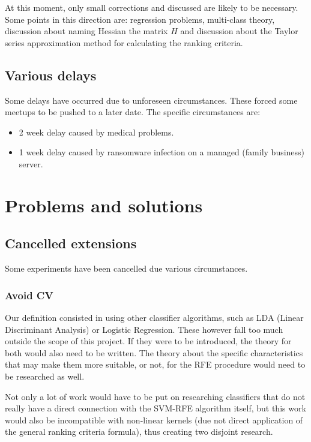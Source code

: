 At this moment, only small corrections and discussed are likely to be necessary. Some points in this direction are: regression problems, multi-class theory, discussion about naming Hessian the matrix $H$ and discussion about the Taylor series ap\-prox\-i\-ma\-tion method for calculating the ranking criteria.

\subsection{Various delays}

Some delays have occurred due to unforeseen circumstances. These forced some meetups to be pushed to a later date. The specific circumstances are:

\begin{itemize}
    \item 2 week delay caused by medical problems.
    \item 1 week delay caused by ransomware infection on a managed (family business) server. 
\end{itemize}

\section{Problems and solutions}

\subsection{Cancelled extensions}

Some experiments have been cancelled due various circumstances.

\subsubsection*{Avoid CV}
Our definition consisted in using other classifier algorithms, such as LDA (Linear Discriminant Analysis) or Logistic Regression. These however fall too much outside the scope of this project. If they were to be introduced, the theory for both would also need to be written. The theory about the specific characteristics that may make them more suitable, or not, for the RFE procedure would need to be researched as well.

Not only a lot of work would have to be put on researching classifiers that do not really have a direct connection with the SVM-RFE algorithm itself, but this work would also be incompatible with non-linear kernels (due not direct application of the general ranking criteria formula), thus creating two disjoint research.

